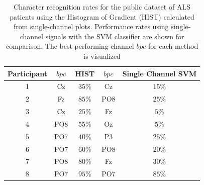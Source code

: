 \documentclass[utf8]{frontiersSCNS} %
\begin{document}
%
%



\begin{table}[htb]
\caption{Character recognition rates for the public dataset of ALS patients using the Histogram of Gradient (HIST) calculated from  single-channel plots.  Performance rates using single-channel signals with the SVM classifier are shown for comparison.  The best performing channel $bpc$ for each method is visualized}
\centering
\begin{tabular}{c|cc|cc}
\toprule
\textbf{Participant}	&  $bpc$ 	&  HIST &  $bpc$	&  Single Channel SVM \\
\midrule
1     &     Cz   &   $35\%$    &  Cz   & $15\%$   \\
2     &     Fz   &   $85\%$      &  PO8   & $25\%$   \\
3     &     Cz   &   $25\%$    &  Fz   & $5\%$   \\
4     &     PO8 &   $55\%$   &  Oz   & $5\%$    \\
5     &     PO7 &   $40\%$    &  P3   & $25\%$   \\
6     &     PO7 &   $60\%$  &  PO8   & $20\%$    \\
7     &     PO8 &   $80\%$   &  Fz   & $30\%$     \\
8     &     PO7 &   $95\%$     &  PO7   & $85\%$ \\

\end{tabular}
\label{tab:resultsals}
\end{table}
\end{document}
